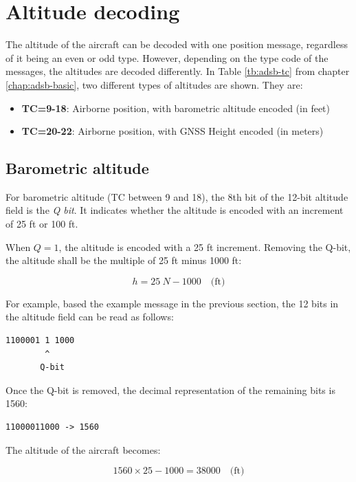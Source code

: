 \section{Altitude decoding}

The altitude of the aircraft can be decoded with one position message, regardless of it being an even or odd type. However, depending on the type code of the messages, the altitudes are decoded differently. In Table \ref{tb:adsb-tc} from chapter \ref{chap:adsb-basic}, two different types of altitudes are shown. They are:

\begin{itemize}
\item \textbf{TC=9-18}: Airborne position, with barometric altitude encoded (in feet)
\item \textbf{TC=20-22}: Airborne position, with GNSS Height encoded (in meters)
\end{itemize}

\subsection{Barometric altitude}
For barometric altitude (TC between 9 and 18), the 8th bit of the 12-bit altitude field is the \emph{Q bit}. It indicates whether the altitude is encoded with an increment of 25 ft or 100 ft.

When $Q=1$, the altitude is encoded with a 25 ft increment. Removing the Q-bit, the altitude shall be the multiple of 25 ft minus 1000 ft:

\begin{equation}
  h = 25 ~ N - 1000 \quad \text{(ft)}
\end{equation}

For example, based the example message in the previous section, the 12 bits in the altitude field can be read as follows:

\begin{verbatim}
1100001 1 1000
        ^
       Q-bit
\end{verbatim}

Once the Q-bit is removed, the decimal representation of the remaining bits is 1560:

\begin{verbatim}
11000011000 -> 1560
\end{verbatim}

The altitude of the aircraft becomes:

\begin{equation}
1560 \times 25 - 1000 = 38000 \quad \text{(ft)}
\end{equation}

